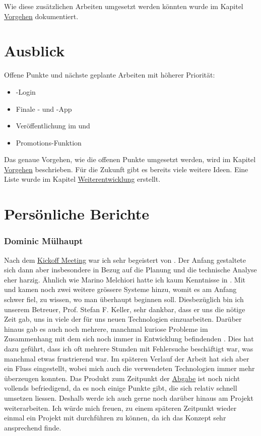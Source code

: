 Wie diese zusätzlichen Arbeiten umgesetzt werden könnten wurde im Kapitel \hyperref[pd-weiterentwicklung-vorgehen]{Vorgehen} dokumentiert.

\section{Ausblick}
Offene Punkte und nächste geplante Arbeiten mit höherer Priorität:

\begin{itemize}
	\item {}-Login
	\item Finale - und -App
	\item Veröffentlichung im  und  
	\item Promotions-Funktion
\end{itemize}

Das genaue Vorgehen, wie die offenen Punkte umgesetzt werden, wird im Kapitel \hyperref[pd-weiterentwicklung-vorgehen]{Vorgehen} beschrieben.
Für die Zukunft gibt es bereits viele weitere Ideen. 
Eine Liste wurde im Kapitel \hyperref[pd-weiterentwicklung-realistisch]{Weiterentwicklung} erstellt. 


\newpage
\section{Persönliche Berichte}
\subsubsection{Dominic Mülhaupt}
Nach dem \hyperref[pm-ms1]{Kickoff Meeting} war ich sehr begeistert von \kort{}.
Der Anfang gestaltete sich dann aber insbesondere in Bezug auf die Planung und die technische Analyse eher harzig.
Ähnlich wie Marino Melchiori hatte ich kaum Kenntnisse in .
Mit  und  kamen noch zwei weitere grössere Systeme hinzu, womit es am Anfang schwer fiel, zu wissen, wo man überhaupt beginnen soll.
Diesbezüglich bin ich unserem Betreuer, Prof. Stefan F. Keller, sehr dankbar, dass er uns die nötige Zeit gab, uns in viele der für uns neuen Technologien einzuarbeiten.\newline
Darüber hinaus gab es auch noch mehrere, manchmal kuriose Probleme im Zusammenhang mit dem sich noch immer in Entwicklung befindenden .
Dies hat dazu geführt, dass ich oft mehrere Stunden mit Fehlersuche beschäftigt war, was manchmal etwas frustrierend war.
Im späteren Verlauf der Arbeit hat sich aber ein Fluss eingestellt, wobei mich auch die verwendeten Technologien immer mehr überzeugen konnten.
Das Produkt zum Zeitpunkt der \hyperref[pm-ms7]{Abgabe} ist noch nicht vollends befriedigend, da es noch einige Punkte gibt, die sich relativ schnell umsetzen liessen.
Deshalb werde ich auch gerne noch darüber hinaus am Projekt weiterarbeiten.\newline
Ich würde mich freuen, zu einem späteren Zeitpunkt wieder einmal ein Projekt mit  durchführen zu können, da ich das Konzept sehr ansprechend finde.

